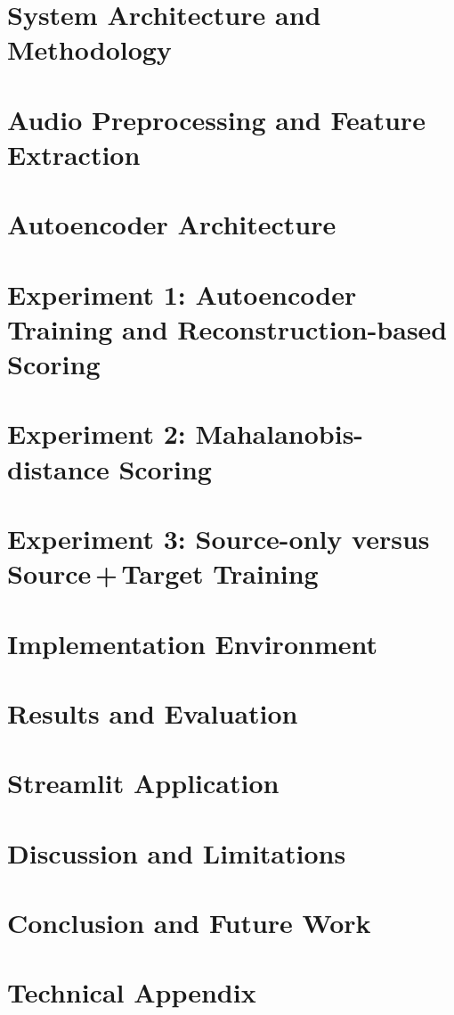 \documentclass[12pt,a4paper,oneside]{report}
\begin{document}
\chapter{System Architecture and Methodology}\label{ch:method}

\chapter[Audio Preprocessing and Features]{Audio Preprocessing and Feature Extraction}\label{ch:prep}

\chapter{Autoencoder Architecture}\label{ch:ae}

\chapter[Experiment 1: Autoencoder Training and MSE Scoring]{Experiment 1: Autoencoder Training and Reconstruction-based Scoring}\label{ch:exp1}

\chapter{Experiment 2: Mahalanobis-distance Scoring}\label{ch:exp2}

\chapter[Experiment 3: Source-only versus Source + Target]{Experiment 3: Source-only versus Source\,+\,Target Training}\label{ch:exp3}

\chapter{Implementation Environment}\label{ch:env}

\chapter{Results and Evaluation}\label{ch:results}

\chapter{Streamlit Application}\label{ch:app}

\chapter{Discussion and Limitations}\label{ch:discussion}

\chapter{Conclusion and Future Work}\label{ch:conclusion}





\appendix
\chapter{Technical Appendix}\label{app:tech}

\end{document}
